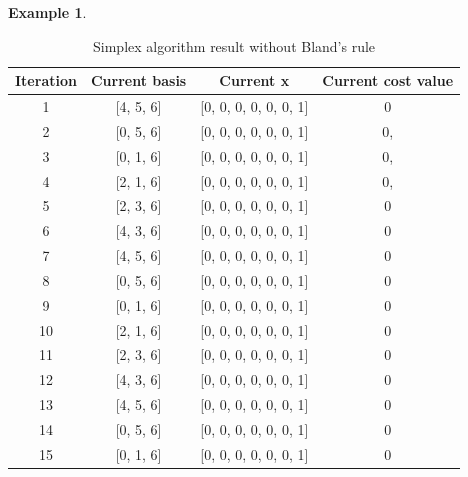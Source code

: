 \documentclass[a4paper,10 pt,titlepage,twoside]{book}
\theoremstyle{plain}
\theoremstyle{definition}
\newtheorem{ex}[thm]{Example}
\theoremstyle{remark}
\begin{document}
\begin{ex}
\begin{table}[h]
	\begin{center}
	\begin{tabular}{|c|c|c|c|}
		\hline
		\textbf{Iteration} & \textbf{Current basis} & \textbf{Current x} & \textbf{Current cost value} \\ \hline
		1 & [4, 5, 6] & [0, 0, 0, 0, 0, 0, 1] & 0 \\ \hline
		2 & [0, 5, 6] & [0, 0, 0, 0, 0, 0, 1] & 0, \\ \hline
		3 & [0, 1, 6] & [0, 0, 0, 0, 0, 0, 1] & 0, \\ \hline
		4 & [2, 1, 6] & [0, 0, 0, 0, 0, 0, 1] & 0, \\ \hline
		5 & [2, 3, 6] & [0, 0, 0, 0, 0, 0, 1] & 0 \\ \hline
		6 & [4, 3, 6] & [0, 0, 0, 0, 0, 0, 1] & 0 \\ \hline
		7 & [4, 5, 6] & [0, 0, 0, 0, 0, 0, 1] & 0 \\ \hline
		8 & [0, 5, 6] & [0, 0, 0, 0, 0, 0, 1] & 0 \\ \hline
		9 & [0, 1, 6] & [0, 0, 0, 0, 0, 0, 1] & 0 \\ \hline
		10 & [2, 1, 6] & [0, 0, 0, 0, 0, 0, 1] & 0 \\ \hline
		11 & [2, 3, 6] & [0, 0, 0, 0, 0, 0, 1] & 0 \\ \hline
		12 & [4, 3, 6] & [0, 0, 0, 0, 0, 0, 1] & 0 \\ \hline
		13 & [4, 5, 6] & [0, 0, 0, 0, 0, 0, 1] & 0 \\ \hline
		14 & [0, 5, 6] & [0, 0, 0, 0, 0, 0, 1] & 0 \\ \hline
		15 & [0, 1, 6] & [0, 0, 0, 0, 0, 0, 1] & 0 \\ \hline
	\end{tabular}\caption{Simplex algorithm result without Bland's rule}
\end{center}
\end{table}
\end{ex} 
\end{document}
